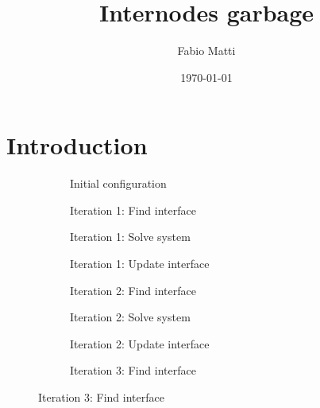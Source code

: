 \documentclass[11pt, a4paper]{article}
\title{Internodes garbage}
\author{Fabio Matti}
\date{\today}
\begin{document}
\maketitle

\section{Introduction}
\label{sec:intro}

\clearpage

\begin{figure}[ht]
    \centering
    \begin{subfigure}[b]{\linewidth}
        \centering
        
        \caption{Initial configuration}\label{fig:example-initial}
    \end{subfigure}
    \begin{subfigure}[b]{.32\linewidth}
        
        \caption{Iteration 1: Find interface}\label{fig:example-iter0-interface}
    \end{subfigure}
    \begin{subfigure}[b]{.32\linewidth}
        
        \caption{Iteration 1: Solve system}\label{fig:example-iter0-solution}
    \end{subfigure}
    \begin{subfigure}[b]{.32\linewidth}
        
        \caption{Iteration 1: Update interface}\label{fig:example-iter0-dumping}
    \end{subfigure}
    \begin{subfigure}[b]{.32\linewidth}
        
        \caption{Iteration 2: Find interface}\label{fig:example-iter1-interface}
    \end{subfigure}
    \begin{subfigure}[b]{.32\linewidth}
        
        \caption{Iteration 2: Solve system}\label{fig:example-iter1-solution}
    \end{subfigure}
    \begin{subfigure}[b]{.32\linewidth}
        
        \caption{Iteration 2: Update interface}\label{fig:example-iter1-dumping}
    \end{subfigure}
    \begin{subfigure}[b]{.32\linewidth}
        
        \caption{Iteration 3: Find interface}\label{fig:example-iter2-interface}

\end{subfigure}
\end{figure}
\end{document}
